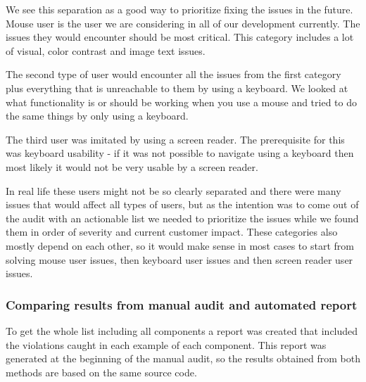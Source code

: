 \documentclass{master_thesis}
\begin{document}
We see this separation as a good way to prioritize  fixing the issues in the future. Mouse user is the user we are considering in all of our development currently. The issues they would encounter should be most critical. This category includes a lot of visual, color contrast and image text issues.

The second type of user would encounter all the issues from the first category plus everything that is unreachable to them by using a keyboard. We looked at what functionality is or should be working when you use a mouse and tried to do the same things by only using a keyboard.

The third user was imitated by using a screen reader. The prerequisite for this was keyboard usability - if it was not possible to navigate using a keyboard then most likely it would not be very usable by a screen reader.

In real life these users might not be so clearly separated and there were many issues that would affect all types of users, but as the intention was to come out of the audit with an actionable list we needed to prioritize the issues while we found them in order of severity and current customer impact. These categories also mostly depend on each other, so it would make sense in most cases to start from solving mouse user issues, then keyboard user issues and then screen reader user issues.

\subsubsection{Comparing results from manual audit and automated report}

To get the whole list including all components a report was created that included the violations caught in each example of each component. This report was generated at the beginning of the manual audit, so the results obtained from both methods are based on the same source code.
\end{document}
